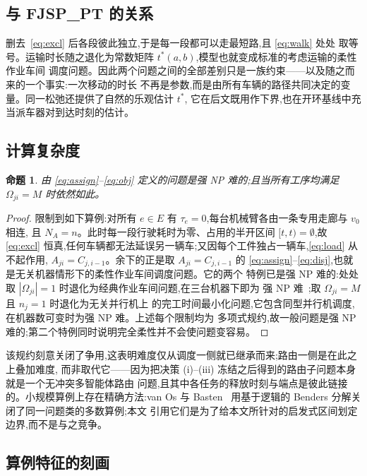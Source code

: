 \documentclass[manuscript,screen,review]{acmart}
\newtheorem{prop}{命题}
\begin{document}
\subsection{与 FJSP\_PT 的关系}

删去~\eqref{eq:excl} 后各段彼此独立,于是每一段都可以走最短路,且 \eqref{eq:walk} 处处
取等号。运输时长随之退化为常数矩阵 $t^{*}(a,b)$,模型也就变成标准的考虑运输的柔性作业车间
调度问题。因此两个问题之间的全部差别只是一族约束——以及随之而来的一个事实:一次移动的时长
不再是参数,而是由所有车辆的路径共同决定的变量。同一松弛还提供了自然的乐观估计 $t^{*}$,
它在后文既用作下界,也在开环基线中充当派车器对到达时刻的估计。

\subsection{计算复杂度}

\begin{prop}
\label{prop:np_hard}
由 \eqref{eq:assign}--\eqref{eq:obj} 定义的问题是强 NP 难的;且当所有工序均满足
$\Omega_{ji}=M$ 时依然如此。
\end{prop}

\begin{proof}
限制到如下算例:对所有 $e\in E$ 有 $\tau_e=0$,每台机械臂各由一条专用走廊与 $v_0$ 相连,
且 $N_A=n$。此时每一段行驶耗时为零、占用的半开区间 $[t,t)=\emptyset$,故 \eqref{eq:excl}
恒真,任何车辆都无法延误另一辆车;又因每个工件独占一辆车,\eqref{eq:load} 从不起作用,
$A_{ji}=C_{j,i-1}$。余下的正是取 $A_{ji}=C_{j,i-1}$ 的
\eqref{eq:assign}--\eqref{eq:disj},也就是无关机器情形下的柔性作业车间调度问题。它的两个
特例已是强 NP 难的:处处取 $|\Omega_{ji}|=1$ 时退化为经典作业车间问题,在三台机器下即为
强 NP 难~\cite{garey1976complexity};取 $\Omega_{ji}=M$ 且 $n_j=1$ 时退化为无关并行机上
的完工时间最小化问题,它包含同型并行机调度,在机器数可变时为强 NP 难。上述每个限制均为
多项式规约,故一般问题是强 NP 难的;第二个特例同时说明完全柔性并不会使问题变容易。
\end{proof}

该规约刻意关闭了争用,这表明难度仅从调度一侧就已继承而来;路由一侧是在此之上叠加难度,
而非取代它——因为把决策 (i)--(iii) 冻结之后得到的路由子问题本身就是一个无冲突多智能体路由
问题,且其中各任务的释放时刻与端点是彼此链接的。小规模算例上存在精确方法:van Os 与
Basten~\cite{vanos2026exact} 用基于逻辑的 Benders 分解关闭了同一问题类的多数算例;本文
引用它们是为了给本文所针对的启发式区间划定边界,而不是与之竞争。

\subsection{算例特征的刻画}
\label{sec:features}
\end{document}
